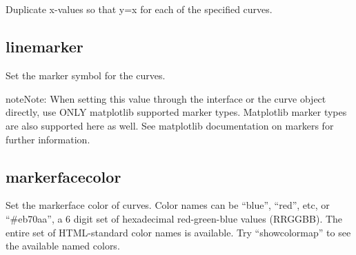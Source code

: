 \documentclass[letterpaper,10pt,english]{sphinxmanual}
\begin{document}
\subsection{}
\label{\detokenize{curve_control_cmds:dupx-2-4}}
Duplicate x-values so that y=x for each of the specified curves.

\begin{sphinxVerbatim}[commandchars=\\\{\}]
\PYG{p}{[}\PYG{p}{]}  
\end{sphinxVerbatim}


\subsection{linemarker}
\label{\detokenize{curve_control_cmds:linemarker}}
Set the marker symbol for the curves.

\begin{sphinxVerbatim}[commandchars=\\\{\}]
\PYG{p}{[}\PYG{p}{]}             \PYG{p}{[}\PYG{p}{]}
\end{sphinxVerbatim}

\begin{sphinxadmonition}{note}{Note:}
When setting this value through the interface or the curve object directly,
use ONLY matplotlib supported marker types. Matplotlib marker types are also
supported here as well. See matplotlib documentation on markers for further
information.
\end{sphinxadmonition}


\subsection{markerfacecolor}
\label{\detokenize{curve_control_cmds:markerfacecolor}}
Set the markerface color of curves. Color names can be “blue”, “red”, etc, or “\#eb70aa”, a 6 digit set of hexadecimal red-green-blue values (RRGGBB). The entire set of HTML-standard color names is available. Try “showcolormap” to see the available named colors.
\end{document}
